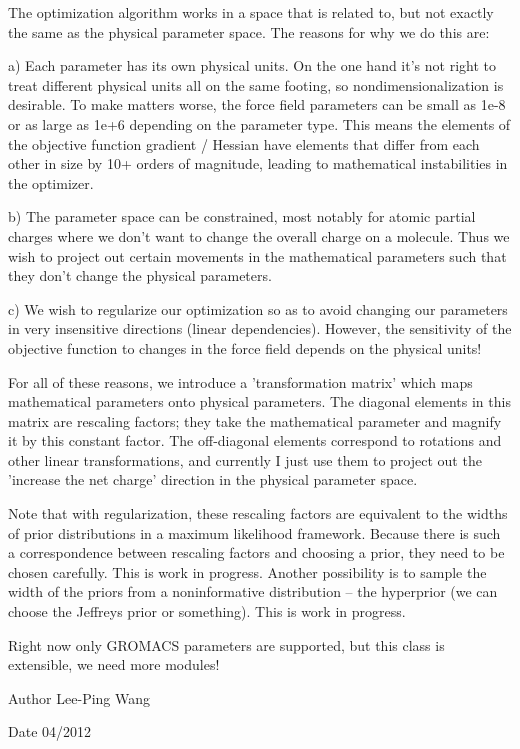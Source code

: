 The optimization algorithm works in a space that is related to, but not exactly the same as the physical parameter space. The reasons for why we do this are\-:

a) Each parameter has its own physical units. On the one hand it's not right to treat different physical units all on the same footing, so nondimensionalization is desirable. To make matters worse, the force field parameters can be small as 1e-\/8 or as large as 1e+6 depending on the parameter type. This means the elements of the objective function gradient / Hessian have elements that differ from each other in size by 10+ orders of magnitude, leading to mathematical instabilities in the optimizer.

b) The parameter space can be constrained, most notably for atomic partial charges where we don't want to change the overall charge on a molecule. Thus we wish to project out certain movements in the mathematical parameters such that they don't change the physical parameters.

c) We wish to regularize our optimization so as to avoid changing our parameters in very insensitive directions (linear dependencies). However, the sensitivity of the objective function to changes in the force field depends on the physical units!

For all of these reasons, we introduce a 'transformation matrix' which maps mathematical parameters onto physical parameters. The diagonal elements in this matrix are rescaling factors; they take the mathematical parameter and magnify it by this constant factor. The off-\/diagonal elements correspond to rotations and other linear transformations, and currently I just use them to project out the 'increase the net charge' direction in the physical parameter space.

Note that with regularization, these rescaling factors are equivalent to the widths of prior distributions in a maximum likelihood framework. Because there is such a correspondence between rescaling factors and choosing a prior, they need to be chosen carefully. This is work in progress. Another possibility is to sample the width of the priors from a noninformative distribution -- the hyperprior (we can choose the Jeffreys prior or something). This is work in progress.

Right now only G\-R\-O\-M\-A\-C\-S parameters are supported, but this class is extensible, we need more modules!

\begin{DoxyAuthor}{Author}
Lee-\/\-Ping Wang 
\end{DoxyAuthor}
\begin{DoxyDate}{Date}
04/2012 
\end{DoxyDate}



